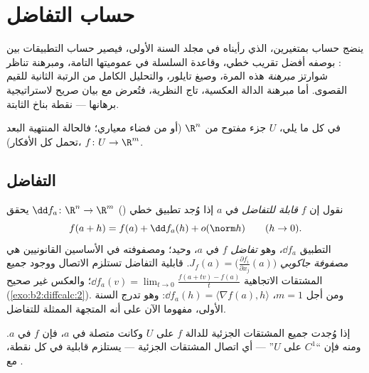 \chapter{حساب التفاضل}\label{ch:b2:diffcalc}

ينضج حساب  بمتغيرين، الذي رأيناه في مجلد السنة الأولى، فيصير
حساب  التطبيقات بين : \emph{} بوصفه
أفضل تقريب خطي، وقاعدة السلسلة في عموميتها التامة، ومبرهنة تناظر
شوارتز \emph{مبرهنة} هذه المرة، وصيغ تايلور، والتحليل الكامل من
الرتبة الثانية للقيم القصوى. أما مبرهنة الدالة العكسية، تاج النظرية،
فتُعرض مع بيان صريح لاستراتيجية برهانها --- نقطة بناخ الثابتة.

في كل ما يلي، $U$ جزء مفتوح من $\R^n$ (أو من فضاء معياري؛ فالحالة
المنتهية البعد تحمل كل الأفكار)، $f \colon U \to
\R^m$.

\section{التفاضل}

\begin{definition}\label{def:b2:diffcalc:differential}
نقول إن $f$ \emph{قابلة للتفاضل} في $a$ إذا وُجد
تطبيق خطي () $\dd f_a \colon \R^n \to \R^m$ يحقق
\[
f(a + h) = f(a) + \dd f_a(h) + o(\norm h)
\qquad (h \to 0).
\]
التطبيق $\dd f_a$، وهو \emph{تفاضل}
$f$ في $a$، وحيد؛ ومصفوفته في الأساسين القانونيين هي
\emph{مصفوفة جاكوبي} $J_f(a) =
\bigl(\frac{\partial f_i}{\partial x_j}(a)\bigr)$.
قابلية التفاضل تستلزم الاتصال ووجود جميع المشتقات
الاتجاهية $\dd f_a(v) = \lim_{t\to0}\frac{f(a + tv)
- f(a)}{t}$؛ والعكس غير صحيح
(\cref{exo:b2:diffcalc:2}). ومن أجل $m = 1$، $\dd f_a(h) = \langle
\nabla f(a), h\rangle$: وهو تدرج السنة الأولى، مفهوما الآن على أنه
المتجهة الممثلة للتفاضل.
\end{definition}

\begin{theorem}[محك $C^1$]\label{thm:b2:diffcalc:c1}
إذا وُجدت جميع المشتقات الجزئية للدالة $f$ على $U$ وكانت متصلة
في $a$، فإن $f$  في $a$. ومنه فإن ``$C^1$ على $U$'' ---
أي اتصال المشتقات الجزئية --- يستلزم قابلية  في كل نقطة،
مع  .
\end{theorem}

